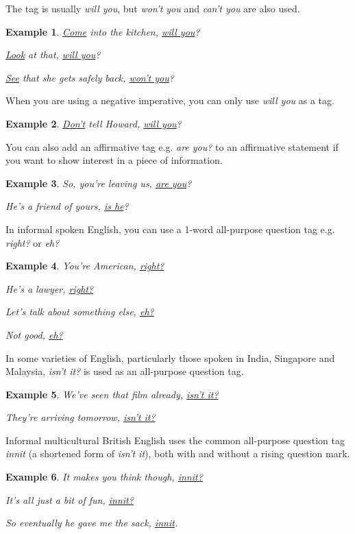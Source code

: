 \documentclass[oneside]{book}
\numberwithin{equation}{section}
\newtheorem{example}{Example}[section]
\begin{document}
The tag is usually \textit{will you}, but \textit{won't you} and \textit{can't you} are also used.
\begin{example}
    \underline{Come} into the kitchen, \underline{will you}?
    
    \underline{Look} at that, \underline{will you}?
    
    \underline{See} that she gets safely back, \underline{won't you}?
\end{example} 
When you are using a negative imperative, you can only use \textit{will you} as a tag.
\begin{example}
    \underline{Don't} tell Howard, \underline{will you}?
\end{example}
You can also add an affirmative tag e.g. \textit{are you?} to an affirmative statement if you want to show interest in a piece of information.
\begin{example}
    So, you're leaving us, \underline{are you}?
    
    He's a friend of yours, \underline{is he}?
\end{example}
%
\noindent{} In informal spoken English, you can use a 1-word all-purpose question tag e.g. \textit{right?} or \textit{eh?}
\begin{example}
    You're American, \underline{right?}
    
    He's a lawyer, \underline{right?}
    
    Let's talk about something else, \underline{eh?}
    
    Not good, \underline{eh?}
\end{example}
In some varieties of English, particularly those spoken in India, Singapore and Malaysia, \textit{isn't it?} is used as an all-purpose question tag.
\begin{example}
    We've seen that film already, \underline{isn't it?}
    
    They're arriving tomorrow, \underline{isn't it?}
\end{example}
Informal multicultural British English uses the common all-purpose question tag \textit{innit} (a shortened form of \textit{isn't it}), both with and without a rising question mark.
\begin{example}
    It makes you think though, \underline{innit?}
    
    It's all just a bit of fun, \underline{innit?}
    
    So eventually he gave me the sack, \underline{innit}.
\end{example}
\end{document}
